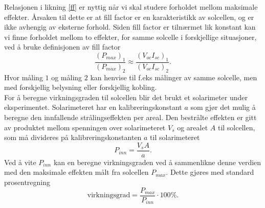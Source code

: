 \documentclass[%
 reprint,
 amsmath,amssymb,
 aps,
 norsk,
 booktabs
]{revtex4-1}
\begin{document}
Relasjonen i likning \eqref{ff} er nyttig når vi skal studere forholdet mellom maksimale effekter. Årsaken til dette er at fill factor er en karakteristikk av solcellen, og er ikke avhengig av eksterne forhold. Siden fill factor er tilnærmet lik konstant kan vi finne forholdet mellom to effekter, for samme solcelle i forskjellige situasjoner, ved å bruke definisjonen av fill factor
\begin{equation}
  \frac{\left(P_{max}\right)_1}{\left(P_{max}\right)_2} \approx \frac{\left(V_{oc}I_{sc}\right)_1}{\left(V_{oc}I_{sc}\right)_2}. \label{maxP}
\end{equation}Hvor måling $1$ og måling $2$ kan henvise til f.eks målinger av samme solcelle, men med forskjellig belysning eller forskjellig kobling.\\
For å beregne virkningsgraden til solcellen blir det brukt et solarimeter under eksperimentet. Solarimeteret har en kalibreringskonstant $a$ som gjør det mulig å beregne den innfallende strålingseffekten per areal. Den bestrålte effekten er gitt av produktet mellom spenningen over solarimeteret $V_s$ og arealet $A$ til solcellen, som må divideres på kalibreringskonstanten $a$ til solarimeteret
\begin{equation}
  P_{inn} = \frac{V_sA}{a} \label{kalibrering}.
\end{equation}
Ved å vite $P_{inn}$ kan en beregne virkningsgraden ved å sammenlikne denne verdien med den maksimale effekten målt fra solcellen $P_{max}$. Dette gjøres med standard prosentregning
\begin{equation}
  \text{virkningsgrad} = \frac{P_{max}}{P_{inn}}\cdot 100\%\label{effekt}.
\end{equation}
\end{document}
